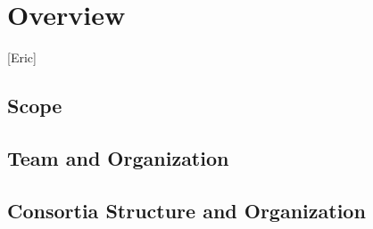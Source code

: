 \chapter{Overview}
\label{vl:tc-overview}

[Eric]

\section{Scope}

\section{Team and Organization}

\section{Consortia Structure and Organization}



